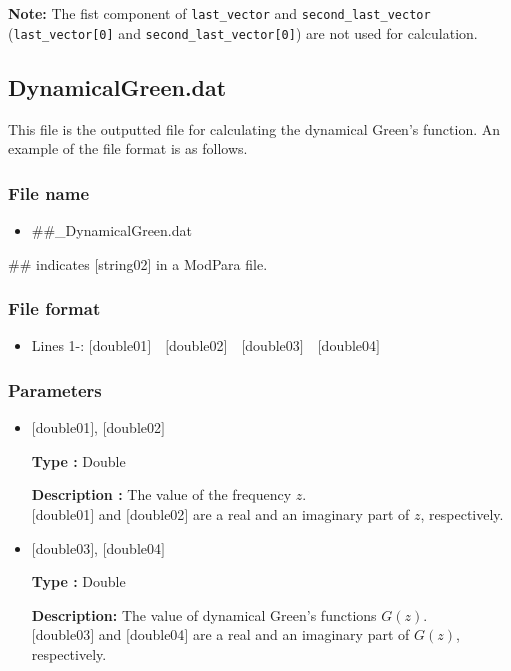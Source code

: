 {\bf Note: } The fist component of \verb|last_vector| and \verb|second_last_vector|
(\verb|last_vector[0]| and \verb|second_last_vector[0]|)
are not used for calculation.

\newpage
\subsection{{DynamicalGreen.dat}}
\label{Subsec:dynamicalG}
This file is the outputted file for calculating the dynamical Green's function. An example of the file format is as follows.

\subsubsection{File name}
\begin{itemize}
   \item{\#\#\_DynamicalGreen.dat}
\end{itemize}
\#\# indicates [string02] in a ModPara file.
  
\subsubsection{File format}
 \begin{itemize}
   \item  Lines 1-: $[$double01$]$~~$[$double02$]$~~$[$double03$]$~~$[$double04$]$
  \end{itemize}
  
\subsubsection{Parameters}
 \begin{itemize}

 \item  $[$double01$]$, $[$double02$]$

 {\bf Type :} Double

 {\bf Description :} The value of the frequency $z$.\\
$[$double01$]$ and $[$double02$]$ are a real and an imaginary part of $z$, respectively.\\

 \item  $[$double03$]$, $[$double04$]$

 {\bf Type :} Double 

 {\bf Description:} The value of dynamical Green's functions $G(z)$.\\
$[$double03$]$ and $[$double04$]$ are a real and an imaginary part of $G(z)$, respectively.\\

\end{itemize}


